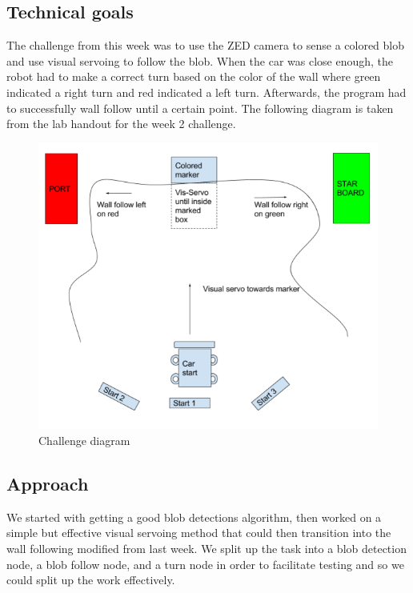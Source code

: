 \documentclass[journal, a4paper]{IEEEtran}
\begin{document}
\subsection{Technical goals}
The challenge from this week was to use the ZED camera to sense a colored blob and use visual servoing to follow the blob. When the car was close enough, the robot had to make a correct turn based on the color of the wall where green indicated a right turn and red indicated a left turn. Afterwards, the program had to successfully wall follow until a certain point. The following diagram is taken from the lab handout for the week 2 challenge. \\ 
\begin{figure}[H]
\includegraphics[scale=.42]{visual_servo.png}
\caption{Challenge diagram \cite{vs-handout}} 
\end{figure}
\subsection{Approach}
We started with getting a good blob detections algorithm, then worked on a simple but effective visual servoing method that could then transition into the wall following modified from last week. We split up the task into a blob detection node, a blob follow node, and a turn node in order to facilitate testing and so we could split up the work effectively. 
\end{document}
